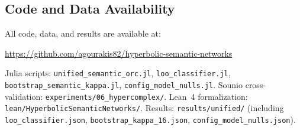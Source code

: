 \documentclass[11pt,a4paper]{article}
\begin{document}
\subsection{Code and Data Availability}

All code, data, and results are available at:

\smallskip
\noindent\url{https://github.com/agourakis82/hyperbolic-semantic-networks}
\smallskip

\noindent Julia scripts: \texttt{unified\_semantic\_orc.jl}, \texttt{loo\_classifier.jl}, \texttt{bootstrap\_semantic\_kappa.jl}, \texttt{config\_model\_nulls.jl}. Sounio cross-validation: \texttt{experiments/06\_hypercomplex/}. Lean~4 formalization: \texttt{lean/HyperbolicSemanticNetworks/}. Results: \texttt{results/unified/} (including \texttt{loo\_classifier.json}, \texttt{bootstrap\_kappa\_16.json}, \texttt{config\_model\_nulls.json}).
\end{document}
